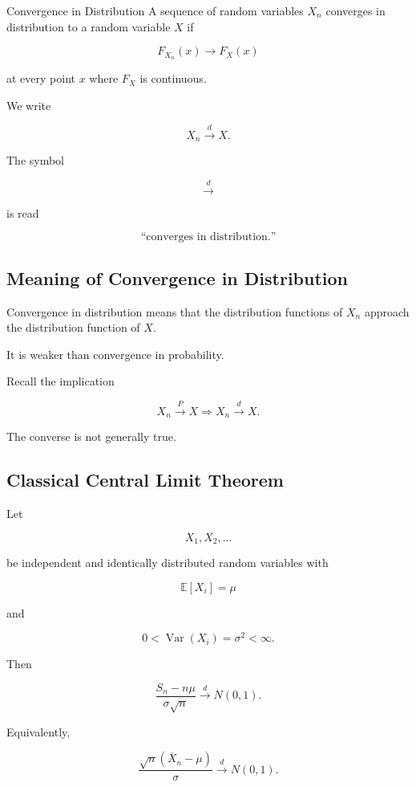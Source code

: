 \begin{definitionbox}{Convergence in Distribution}
A sequence of random variables \(X_n\) converges in distribution to a
random variable \(X\) if

\[
\boxed{
F_{X_n}(x)
\to
F_X(x)
}
\]

at every point \(x\) where \(F_X\) is continuous.
\end{definitionbox}

We write

\[
\boxed{
X_n
\xrightarrow{d}
X.
}
\]

The symbol

\[
\xrightarrow{d}
\]

is read

\[
\text{``converges in distribution.''}
\]

\subsection{Meaning of Convergence in Distribution}
\label{subsec:meaning-convergence-distribution}

Convergence in distribution means that the distribution functions of
\(X_n\) approach the distribution function of \(X\).

It is weaker than convergence in probability.

Recall the implication

\[
\boxed{
X_n
\xrightarrow{P}
X
\Longrightarrow
X_n
\xrightarrow{d}
X.
}
\]

The converse is not generally true.

\subsection{Classical Central Limit Theorem}
\label{subsec:classical-central-limit-theorem}

\begin{theorem}
Let

\[
X_1,X_2,\ldots
\]

be independent and identically distributed random variables with

\[
\mathbb{E}[X_i]=\mu
\]

and

\[
0<
\operatorname{Var}(X_i)
=
\sigma^2
<
\infty.
\]

Then

\[
\boxed{
\frac{
S_n-n\mu
}{
\sigma\sqrt{n}
}
\xrightarrow{d}
N(0,1).
}
\]

Equivalently,

\[
\boxed{
\frac{
\sqrt{n}
(\overline{X}_n-\mu)
}{
\sigma
}
\xrightarrow{d}
N(0,1).
}
\]
\end{theorem}

